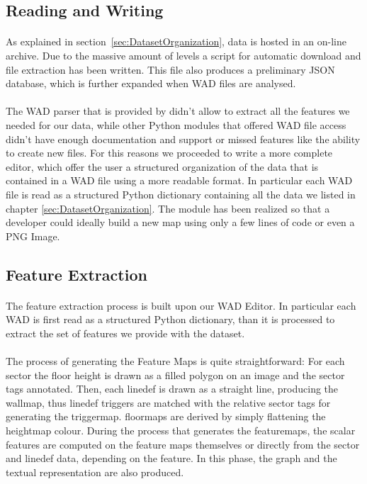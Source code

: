 \subsection{Reading and Writing}
\paragraph{} As explained in  section~\ref{sec:DatasetOrganization}, data is hosted in an on-line archive. Due to the massive amount of levels a script for automatic download and file extraction has been written. This file also produces a preliminary JSON database, which is further expanded when WAD files are analysed.
\paragraph{} The WAD parser that is provided by  didn't allow to extract all the features we needed for our data, while other Python modules that offered WAD file access didn't have enough documentation and support or missed features like the ability to create new files. For this reasons we proceeded to write a more complete editor, which offer the user a structured organization of the data that is contained in a WAD file using a more readable format. In particular each WAD file is read as a structured Python dictionary containing all the data we listed in chapter \ref{sec:DatasetOrganization}. The module has been realized so that a developer could ideally build a new map using only a few lines of code or even a PNG Image.


\subsection{Feature Extraction}
\paragraph{} The feature extraction process is built upon our WAD Editor. In particular each WAD is first read as a structured Python dictionary, than it is processed to extract the set of features we provide with the dataset.
\paragraph{} The process of generating the Feature Maps is quite straightforward: For each \gls{sector} the floor height is drawn as a filled polygon on an image and the sector tags annotated. Then, each linedef is drawn as a straight line, producing the \gls{wallmap}, thus linedef triggers are matched with the relative sector tags for generating the \gls{triggermap}. \glspl{floormap} are derived by simply flattening the heightmap colour. During the process that generates the \glspl{featuremap}, the scalar features are computed on the feature maps themselves or directly from the sector and linedef data, depending on the feature. In this phase, the graph and the textual representation are also produced. 
